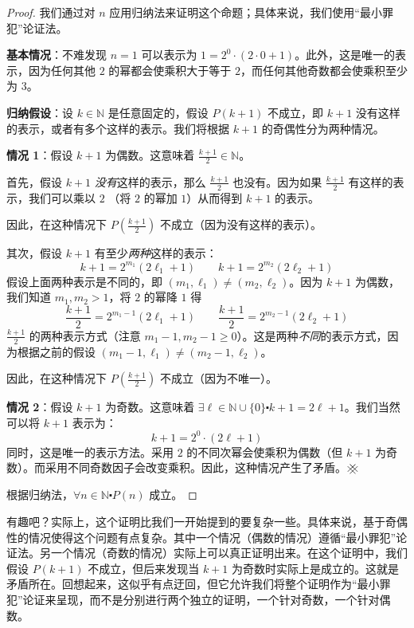 \begin{proof}
    我们通过对 $n$ 应用归纳法来证明这个命题；具体来说，我们使用``最小罪犯''论证法。

    \textbf{基本情况}：不难发现 $n = 1$ 可以表示为 $1 = 2^0 \cdot (2 \cdot 0 + 1)$。此外，这是唯一的表示，因为任何其他 $2$ 的幂都会使乘积大于等于 $2$，而任何其他奇数都会使乘积至少为 $3$。

    \textbf{归纳假设}：设 $k \in \mathbb{N}$ 是任意固定的，假设 $P(k+1)$ 不成立，即 $k+1$ 没有这样的表示，或者有多个这样的表示。我们将根据 $k+1$ 的奇偶性分为两种情况。

    \textbf{情况 1}：假设 $k+1$ 为偶数。这意味着 $\frac{k+1}{2} \in \mathbb{N}$。

    首先，假设 $k+1$ \emph{没有}这样的表示，那么 $\frac{k+1}{2}$ 也没有。因为如果 $\frac{k+1}{2}$ 有这样的表示，我们可以乘以 $2$ （将 $2$ 的幂加 $1$）从而得到 $k+1$ 的表示。

    因此，在这种情况下 $P(\frac{k+1}{2})$ 不成立（因为没有这样的表示）。

    其次，假设 $k+1$ 有至少\emph{两种}这样的表示：
    \[k + 1 = 2^{m_1}(2\ell_1 + 1) \qquad k + 1 = 2^{m_2}(2\ell_2 + 1)\]
    假设上面两种表示是不同的，即 $(m_1, \ell_1) \ne (m_2, \ell_2)$。因为 $k+1$ 为偶数，我们知道 $m_1, m_2 > 1$，将 $2$ 的幂降 $1$ 得
    \[\frac{k+1}{2}=2^{m_1-1}(2\ell_1+1) \qquad \frac{k+1}{2}=2^{m_2-1}(2\ell_2+1)\]
    $\frac{k+1}{2}$ 的两种表示方式（注意 $m_1-1, m_2-1 \ge 0$）。这是两种\emph{不同}的表示方式，因为根据之前的假设 $(m_1-1, \ell_1) \ne (m_2-1, \ell_2)$。

    因此，在这种情况下 $P(\frac{k+1}{2})$ 不成立（因为不唯一）。

    \textbf{情况 2}：假设 $k+1$ 为奇数。这意味着 $\exists \ell \in \mathbb{N} \cup \{0\} \centerdot k+1 = 2\ell + 1$。我们当然可以将 $k+1$ 表示为：
    \[k+1 = 2^0 \cdot (2\ell + 1)\]
    同时，这是唯一的表示方法。采用 $2$ 的不同次幂会使乘积为偶数（但 $k+1$ 为奇数）。而采用不同奇数因子会改变乘积。因此，这种情况产生了矛盾。$\hashx$

    根据归纳法，$\forall n \in \mathbb{N} \centerdot P(n)$ 成立。
\end{proof}

有趣吧？实际上，这个证明比我们一开始提到的要复杂一些。具体来说，基于奇偶性的情况使得这个问题有点复杂。其中一个情况（偶数的情况）遵循``最小罪犯''论证法。另一个情况（奇数的情况）实际上可以真正证明出来。在这个证明中，我们假设 $P(k+1)$ 不成立，但后来发现当 $k+1$ 为奇数时实际上是成立的。这就是矛盾所在。回想起来，这似乎有点迂回，但它允许我们将整个证明作为``最小罪犯''论证来呈现，而不是分别进行两个独立的证明，一个针对奇数，一个针对偶数。

